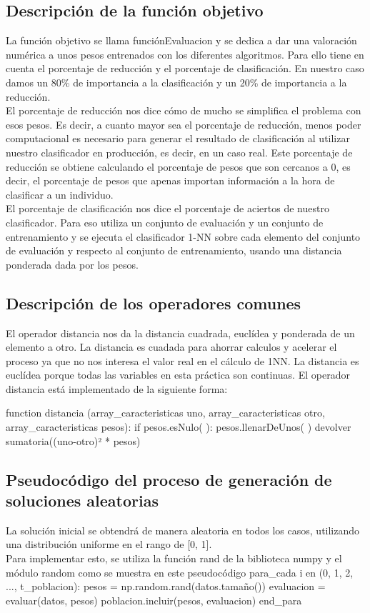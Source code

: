 \documentclass[12pt, spanish]{article}
\begin{document}
\subsection{Descripción de la función objetivo }
La función objetivo se llama funciónEvaluacion y se dedica a dar una valoración numérica a unos pesos entrenados con los diferentes algoritmos. Para ello tiene en cuenta el porcentaje de reducción y el porcentaje de clasificación. En nuestro caso damos un 80\% de importancia a la clasificación y un 20\% de importancia a la reducción. \\
\newline
El porcentaje de reducción nos dice cómo de mucho se simplifica el problema con esos pesos. Es decir, a cuanto mayor sea el porcentaje de reducción, menos poder computacional es necesario para generar el resultado de clasificación al utilizar nuestro clasificador en producción, es decir, en un caso real. Este porcentaje de reducción se obtiene calculando el porcentaje de pesos que son cercanos a 0, es decir, el porcentaje de pesos que apenas importan información a la hora de clasificar a un individuo. \\
\newline
El porcentaje de clasificación nos dice el porcentaje de aciertos de nuestro clasificador. Para eso utiliza un conjunto de evaluación y un conjunto de entrenamiento y se ejecuta el clasificador 1-NN sobre cada elemento del conjunto de evaluación y respecto al conjunto de entrenamiento, usando una distancia ponderada dada por los pesos. 

\subsection{Descripción de los operadores comunes}
El operador distancia nos da la distancia cuadrada, euclídea y ponderada de un elemento a otro. La distancia es cuadada para ahorrar calculos y acelerar el proceso ya que no nos interesa el valor real en el cálculo de 1NN. La distancia es euclídea porque todas las variables en esta práctica son continuas. 
El operador distancia está implementado de la siguiente forma: 

function distancia (array\_caracteristicas uno, array\_caracteristicas otro, array\_caracteristicas pesos):  
    if pesos.esNulo( ): 
	    pesos.llenarDeUnos( )
devolver sumatoria((uno-otro)² * pesos)

\subsection{Pseudocódigo del proceso de generación de soluciones aleatorias}
La solución inicial se obtendrá de manera aleatoria en todos los casos, utilizando una distribución uniforme en el rango de [0, 1].\\
\newline
Para implementar esto, se utiliza la función rand de la biblioteca numpy y el módulo random como se muestra en este pseudocódigo
para\_cada i en (0, 1, 2, ...,  t\_poblacion):
       	pesos = np.random.rand(datos.tamaño())
        	evaluacion = evaluar(datos, pesos) 
	poblacion.incluir(pesos, evaluacion)
end\_para
\end{document}

